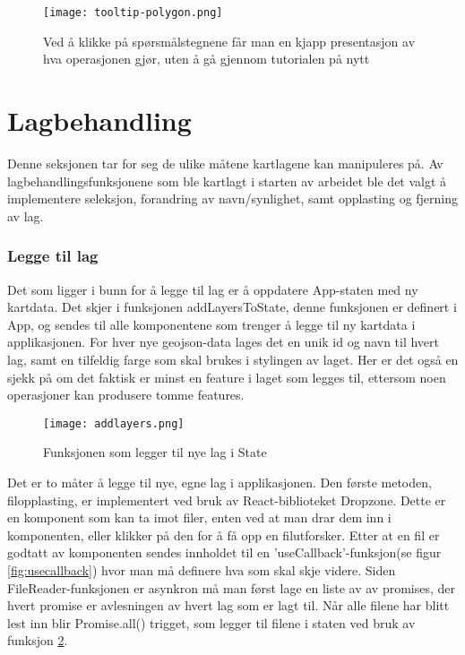 \begin{figure}[h]
    \center
    \texttt{[image: tooltip-polygon.png]}
    \caption{Ved å klikke på spørsmålstegnene får man en kjapp presentasjon av hva operasjonen gjør, uten å gå gjennom tutorialen på nytt}
    \label{fig:tooltip}
\end{figure}

\section{Lagbehandling}
\label{sec:lagbehandling}
Denne seksjonen tar for seg de ulike måtene kartlagene kan manipuleres på. Av lagbehandlingsfunksjonene som ble kartlagt i starten av arbeidet ble det valgt å implementere seleksjon, forandring av navn/synlighet, samt opplasting og fjerning av lag. 

\subsubsection{Legge til lag}

Det som ligger i bunn for å legge til lag er å oppdatere App-staten med ny kartdata. Det skjer i funksjonen addLayersToState, denne funksjonen er definert i App, og sendes til alle komponentene som trenger å legge til ny kartdata i applikasjonen. For hver nye geojson-data lages det en unik id og navn til hvert lag, samt en tilfeldig farge som skal brukes i stylingen av laget. Her er det også en sjekk på om det faktisk er minst en feature i laget som legges til, ettersom noen operasjoner kan produsere tomme features. 

\begin{figure}[h]
    \center
    \texttt{[image: addlayers.png]}
    \caption{Funksjonen som legger til nye lag i State}
    \label{fig:addLayers}
\end{figure}

Det er to måter å legge til nye, egne lag i applikasjonen. Den første metoden, filopplasting, er implementert ved bruk av React-biblioteket Dropzone. Dette er en komponent som kan ta imot filer, enten ved at man drar dem inn i komponenten, eller klikker på den for å få opp en filutforsker. Etter at en fil er godtatt av komponenten sendes innholdet til en 'useCallback'-funksjon(se figur \ref{fig:usecallback}) hvor man må definere hva som skal skje videre. Siden FileReader-funksjonen er asynkron må man først lage en liste av av promises, der hvert promise er avlesningen av hvert lag som er lagt til. Når alle filene har blitt lest inn blir Promise.all() trigget, som legger til filene i staten ved bruk av funksjon \ref{fig:addLayers}.

